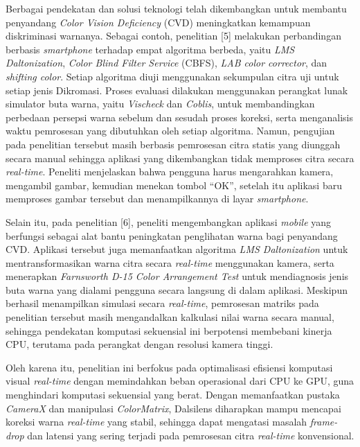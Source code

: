 Berbagai pendekatan dan solusi teknologi telah dikembangkan untuk membantu penyandang \textit{Color Vision Deficiency} (CVD) meningkatkan kemampuan diskriminasi warnanya. Sebagai contoh, penelitian [5] melakukan perbandingan berbasis \textit{smartphone} terhadap empat algoritma berbeda, yaitu \textit{LMS Daltonization}, \textit{Color Blind Filter Service} (CBFS), \textit{LAB color corrector}, dan \textit{shifting color}. Setiap algoritma diuji menggunakan sekumpulan citra uji untuk setiap jenis Dikromasi. Proses evaluasi dilakukan menggunakan perangkat lunak simulator buta warna, yaitu \textit{Vischeck} dan \textit{Coblis}, untuk membandingkan perbedaan persepsi warna sebelum dan sesudah proses koreksi, serta menganalisis waktu pemrosesan yang dibutuhkan oleh setiap algoritma. Namun, pengujian pada penelitian tersebut masih berbasis pemrosesan citra statis yang diunggah secara manual sehingga aplikasi yang dikembangkan tidak memproses citra secara \textit{real-time}. Peneliti menjelaskan bahwa pengguna harus mengarahkan kamera, mengambil gambar, kemudian menekan tombol ``OK'', setelah itu aplikasi baru memproses gambar tersebut dan menampilkannya di layar \textit{smartphone}.

Selain itu, pada penelitian [6], peneliti mengembangkan aplikasi \textit{mobile} yang berfungsi sebagai alat bantu peningkatan penglihatan warna bagi penyandang CVD. Aplikasi tersebut juga memanfaatkan algoritma \textit{LMS Daltonization} untuk mentransformasikan warna citra secara \textit{real-time} menggunakan kamera, serta menerapkan \textit{Farnsworth D-15 Color Arrangement Test} untuk mendiagnosis jenis buta warna yang dialami pengguna secara langsung di dalam aplikasi. Meskipun berhasil menampilkan simulasi secara \textit{real-time}, pemrosesan matriks pada penelitian tersebut masih mengandalkan kalkulasi nilai warna secara manual, sehingga pendekatan komputasi sekuensial ini berpotensi membebani kinerja CPU, terutama pada perangkat dengan resolusi kamera tinggi.

Oleh karena itu, penelitian ini berfokus pada optimalisasi efisiensi komputasi visual \textit{real-time} dengan memindahkan beban operasional dari CPU ke GPU, guna menghindari komputasi sekuensial yang berat. Dengan memanfaatkan pustaka \textit{CameraX} dan manipulasi \textit{ColorMatrix}, Dalsilens diharapkan mampu mencapai koreksi warna \textit{real-time} yang stabil, sehingga dapat mengatasi masalah \textit{frame-drop} dan latensi yang sering terjadi pada pemrosesan citra \textit{real-time} konvensional.

